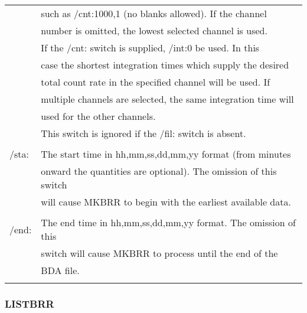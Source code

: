 \begin{center}
\begin{tabular}{|l l|}
              &  such as /cnt:1000,1 (no blanks allowed).  If the channel  \\
              &  number is omitted, the lowest selected channel is used.  \\
              &  If the /cnt: switch is supplied, /int:0 be used.  In this  \\
              &  case the shortest integration times which supply the desired  \\
              &  total count rate in the specified channel will be used.  If  \\
              &  multiple channels are selected, the same integration time will \\
              &   used for the other channels. \\
              &  This switch is ignored if the /fil: switch is absent. \\
              &  \\          
	/sta: &	The start time in hh,mm,ss,dd,mm,yy format (from minutes  \\
              &  onward the quantities are optional). The omission of this switch  \\
              &  will cause MKBRR to begin with the earliest available data. \\
              &  \\          
	/end: &	The end time in hh,mm,ss,dd,mm,yy format. The omission of this \\ 
	      &	switch will cause MKBRR to process until the end of the  \\
              &  BDA file. \\
              &  \\         
\hline
\end{tabular}
\end{center}

\newpage

\subsubsection{LISTBRR}

